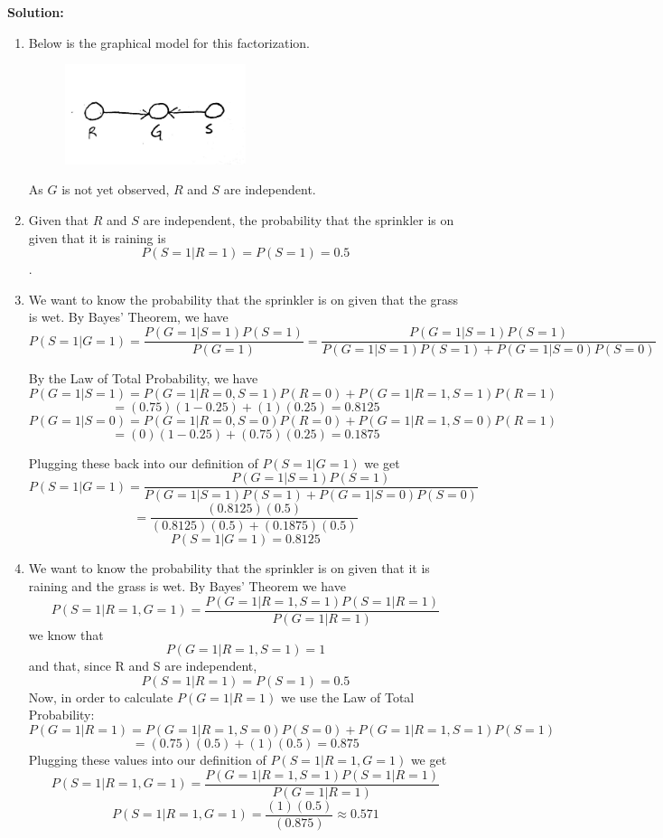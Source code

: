 \documentclass[submit]{harvardml}
\begin{document}
\newpage
\textbf{Solution:}
\begin{enumerate}
    \item 
    Below is the graphical model for this factorization.
    \begin{figure}[H]
        \centering
        \includegraphics[width=0.5\textwidth]{cs181hw6}
    \end{figure}
    As $G$ is not yet observed,
    $R$ and $S$ are independent.

    \item 
    Given that $R$ and $S$ are independent, the probability that the sprinkler
    is on given that it is raining is 
    $$\boxed{P(S=1|R=1)=P(S=1)=0.5}$$.
    
    \item
    We want to know the probability that the sprinkler is on given that the grass is wet.
    By Bayes' Theorem, we have
    $$P(S=1|G=1)=\frac{P(G=1|S=1)P(S=1)}{P(G=1)}=\frac{P(G=1|S=1)P(S=1)}{P(G=1|S=1)P(S=1)+P(G=1|S=0)P(S=0)}$$

    By the Law of Total Probability, we have
    $$P(G=1|S=1)=P(G=1|R=0,S=1)P(R=0)+P(G=1|R=1,S=1)P(R=1)$$
    $$=(0.75)(1-0.25)+(1)(0.25)=0.8125$$
    $$P(G=1|S=0)=P(G=1|R=0,S=0)P(R=0)+P(G=1|R=1,S=0)P(R=1)$$
    $$=(0)(1-0.25)+(0.75)(0.25)=0.1875$$

    Plugging these back into our definition of $P(S=1|G=1)$ we get
    $$P(S=1|G=1)=\frac{P(G=1|S=1)P(S=1)}{P(G=1|S=1)P(S=1)+P(G=1|S=0)P(S=0)}$$
    $$=\frac{(0.8125)(0.5)}{(0.8125)(0.5)+(0.1875)(0.5)}$$
    $$\boxed{P(S=1|G=1)=0.8125}$$

    \item
    We want to know the probability that the sprinkler is on given that it is raining and the grass
    is wet. By Bayes' Theorem we have
    $$P(S=1|R=1,G=1)=\frac{P(G=1|R=1,S=1)P(S=1|R=1)}{P(G=1|R=1)}$$
    we know that 
    $$P(G=1|R=1,S=1)=1$$
    and that, since R and S are independent, 
    $$P(S=1|R=1)=P(S=1)=0.5$$
    Now, in order to calculate $P(G=1|R=1)$ we use the Law of Total Probability:
    $$P(G=1|R=1)=P(G=1|R=1,S=0)P(S=0)+P(G=1|R=1,S=1)P(S=1)$$
    $$=(0.75)(0.5)+(1)(0.5)=0.875$$
    Plugging these values into our definition of $P(S=1|R=1,G=1)$ we get
    $$P(S=1|R=1,G=1)=\frac{P(G=1|R=1,S=1)P(S=1|R=1)}{P(G=1|R=1)}$$
    $$\boxed{P(S=1|R=1,G=1)=\frac{(1)(0.5)}{(0.875)}\approx 0.571}$$


\end{enumerate}
\end{document}
